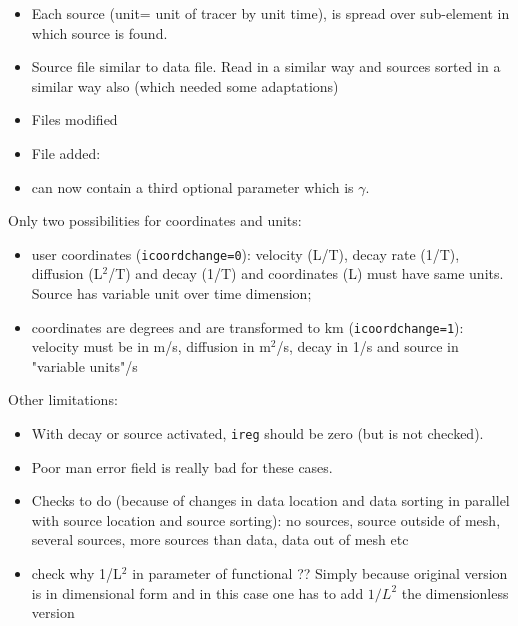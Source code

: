 \begin{itemize}
\item
Each source (unit= unit of tracer by unit time), is spread over sub-element in which source is found.
\item
Source file  similar to data file. Read in a similar way and sources sorted in a similar way also (which needed some adaptations)
\item Files modified
\item File added: 
\item {} can now contain a third optional parameter which is $\gamma$.
\end{itemize}

Only two possibilities for coordinates and units:
\begin{itemize}
\item user coordinates ({\tt icoordchange=0}): velocity (L/T), decay rate (1/T), diffusion (L$^2$/T) and decay (1/T) and coordinates (L) must have same units. Source has variable unit over time dimension;
\item coordinates are degrees and are transformed to km ({\tt icoordchange=1}): velocity must be in m/s, diffusion in m$^2$/s, decay in 1/s and source in "variable units"/s
\end{itemize}
Other limitations: 
\begin{itemize}
\item
With decay or source activated, {\tt ireg} should be zero (but is not checked).
\item
Poor man error field is really bad for these cases.
\end{itemize}

%
%


\begin{itemize}
\item Checks to do (because of changes in data location and data sorting in parallel with source location and source sorting): no sources, source outside of mesh, several sources, more sources than data, data out of mesh etc
\item check why 1/L$^2$ in parameter of functional ?? Simply because original version is in dimensional form and in this case one has to add $1/L^2$ the dimensionless version
\end{itemize}

